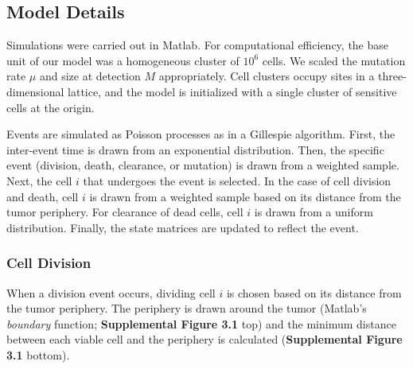 \documentclass{article}
\begin{document}
\subsection{Model Details}

Simulations were carried out in Matlab. For computational efficiency, the base unit of our model was a homogeneous cluster of $10^6$ cells.  We scaled the mutation rate $\mu$ and size at detection $M$ appropriately.  Cell clusters occupy sites in a three-dimensional lattice, and the model is initialized with a single cluster of sensitive cells at the origin.

Events are simulated as Poisson processes as in a Gillespie algorithm.  First, the inter-event time is drawn from an exponential distribution.  Then, the specific event (division, death, clearance, or mutation) is drawn from a weighted sample.  Next, the cell $i$ that undergoes the event is selected.  In the case of cell division and death, cell $i$ is drawn from a weighted sample based on its distance from the tumor periphery.  For clearance of dead cells, cell $i$ is drawn from a uniform distribution.  Finally, the state matrices are updated to reflect the event.

\subsubsection{Cell Division}

When a division event occurs, dividing cell $i$ is chosen based on its distance from the tumor periphery.  The periphery is drawn around the tumor (Matlab's \textit{boundary} function; \textbf{Supplemental Figure 3.1} top) and the minimum distance between each viable cell and the periphery is calculated (\textbf{Supplemental Figure 3.1} bottom).
\end{document}
